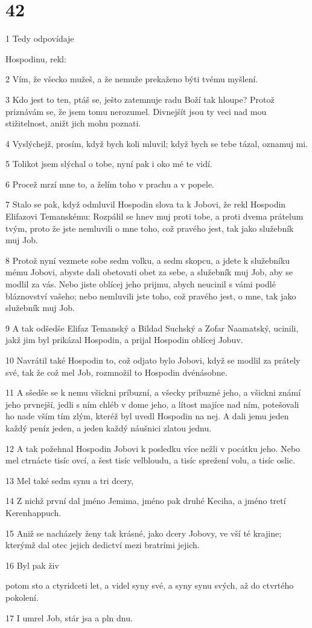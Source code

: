 \chapter{42}

\par 1 Tedy odpovídaje \par Hospodinu, rekl:
\par 2 Vím, že všecko mužeš, a že nemuže prekaženo býti tvému myšlení.
\par 3 Kdo jest to ten, ptáš se, ješto zatemnuje radu Boží tak hloupe? Protož priznávám se, že jsem tomu nerozumel. Divnejšít jsou ty veci nad mou stižitelnost, anižt jich mohu poznati.
\par 4 Vyslýchejž, prosím, když bych koli mluvil; když bych se tebe tázal, oznamuj mi.
\par 5 Tolikot jsem slýchal o tobe, nyní pak i oko mé te vidí.
\par 6 Procež mrzí mne to, a želím toho v prachu a v popele.
\par 7 Stalo se pak, když odmluvil Hospodin slova ta k Jobovi, že rekl Hospodin Elifazovi Temanskému: Rozpálil se hnev muj proti tobe, a proti dvema prátelum tvým, proto že jste nemluvili o mne toho, což pravého jest, tak jako služebník muj Job.
\par 8 Protož nyní vezmete sobe sedm volku, a sedm skopcu, a jdete k služebníku mému Jobovi, abyste dali obetovati obet za sebe, a služebník muj Job, aby se modlil za vás. Nebo jiste oblícej jeho prijmu, abych neucinil s vámi podlé bláznovství vašeho; nebo nemluvili jste toho, což pravého jest, o mne, tak jako služebník muj Job.
\par 9 A tak odšedše Elifaz Temanský a Bildad Suchský a Zofar Naamatský, ucinili, jakž jim byl prikázal Hospodin, a prijal Hospodin oblícej Jobuv.
\par 10 Navrátil také Hospodin to, což odjato bylo Jobovi, když se modlil za prátely své, tak že což mel Job, rozmnožil to Hospodin dvénásobne.
\par 11 A sšedše se k nemu všickni príbuzní, a všecky príbuzné jeho, a všickni známí jeho prvnejší, jedli s ním chléb v dome jeho, a lítost majíce nad ním, potešovali ho nade vším tím zlým, kteréž byl uvedl Hospodin na nej. A dali jemu jeden každý peníz jeden, a jeden každý náušnici zlatou jednu.
\par 12 A tak požehnal Hospodin Jobovi k posledku více nežli v pocátku jeho. Nebo mel ctrnácte tisíc ovcí, a šest tisíc velbloudu, a tisíc sprežení volu, a tisíc oslic.
\par 13 Mel také sedm synu a tri dcery,
\par 14 Z nichž první dal jméno Jemima, jméno pak druhé Keciha, a jméno tretí Kerenhappuch.
\par 15 Aniž se nacházely ženy tak krásné, jako dcery Jobovy, ve vší té krajine; kterýmž dal otec jejich dedictví mezi bratrími jejich.
\par 16 Byl pak živ \par potom sto a ctyridceti let, a videl syny své, a syny synu svých, až do ctvrtého pokolení.
\par 17 I umrel Job, stár jsa a pln dnu.

